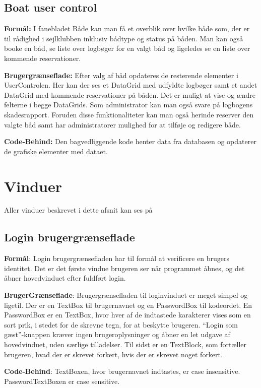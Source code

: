 \subsection{Boat user control}

\textbf{Formål:}
I fanebladet Både kan man få et overblik over hvilke både som, der er til rådighed i sejlklubben inklusiv bådtype og status på båden. 
Man kan også booke en båd, se liste over logbøger for en valgt båd og ligeledes se en liste over kommende reservationer. 

\textbf{Brugergrænseflade:}
Efter valg af båd opdateres de resterende elementer i UserControlen. 
Her kan der ses et DataGrid med udfyldte logbøger samt et andet DataGrid med kommende reservationer på båden.
Det er muligt at vise og ændre felterne i begge DataGrids.
Som administrator kan man også svare på logbogens skadesrapport.
Foruden disse funktionaliteter kan man også herinde reserver den valgte båd samt har administratorer mulighed for at tilføje og redigere både.

\textbf{Code-Behind:}
Den bagvedliggende kode henter data fra databasen og opdaterer de grafiske elementer med dataet. 


\section{Vinduer}
Aller vinduer beskrevet i dette afsnit kan ses på 

\subsection{Login brugergrænseflade}
 
\textbf{Formål}:
Login brugergrænsefladen har til formål at verificere en brugers identitet. 
Det er det første vindue brugeren ser når programmet åbnes, og det åbner hovedvinduet efter fuldført login.
 
\textbf{BrugerGrænseflade}: 
Brugergrænsefladen til loginvinduet er meget simpel og ligetil. 
Der er en TextBox til brugernavnet og en PasswordBox til kodeordet.
En PasswordBox er en TextBox, hvor hver af de indtastede karakterer vises som en sort prik, i stedet for de skrevne tegn, for at beskytte brugeren.
``Login som gæst''-knappen kræver ingen brugeroplysninger og åbner en let udgave af hovedvinduet, uden særlige tilladelser.
Til sidst er en TextBlock, som fortæller brugeren, hvad der er skrevet forkert, hvis der er skrevet noget forkert.

\textbf{Code-Behind}: 
TextBoxen, hvor brugernavnet indtastes, er case insensitive.
PasswordTextBoxen er case sensitive. 


